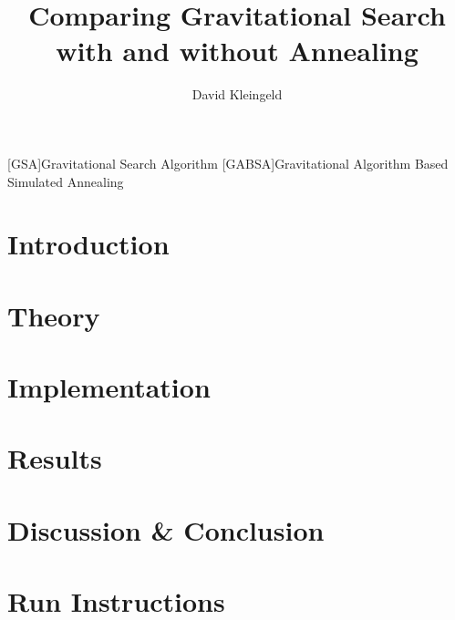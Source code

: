 \documentclass[lang=en, hanging-titles=true]{skrapport}
\title{Comparing Gravitational Search with and without Annealing}
\author[dskleingeld@gmail.com]{David Kleingeld}
\begin{document}
\maketitle
\tableofcontents

\begin{acronym}
[GSA]{Gravitational Search Algorithm}
[GABSA]{Gravitational Algorithm Based Simulated Annealing}
\end{acronym}

\section{Introduction}

\section{Theory}

\section{Implementation}

\section{Results}

\section{Discussion \& Conclusion}


\printbibliography
\clearpage
\appendix
\section{Run Instructions}

\end{document}
